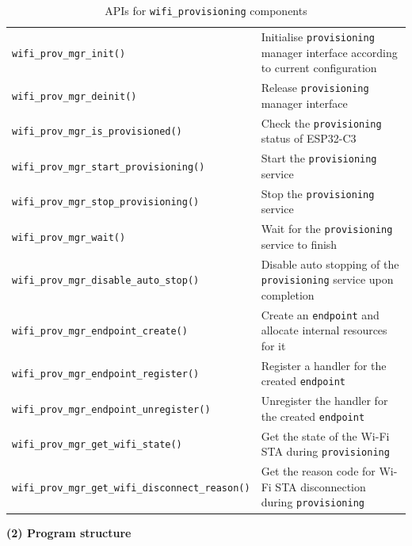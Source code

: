 \documentclass[a4paper,12pt,openany]{book}
\renewcommand{\arraystretch}{1}
\begin{document}
\begin{table}[h!]
    \renewcommand{\arraystretch}{1}
    \caption{APIs for \texttt{wifi\_provisioning} components}
    \begin{tabular}{|>{\footnotesize}m{}|>{\footnotesize}m{}|}
        \hline
        \rowcolor{LightBlue}\multicolumn{1}{|c|}{\textbf{API}}&\multicolumn{1}{c|}{\textbf{Description}}\\
        \hline
        \verb|wifi_prov_mgr_init()|&Initialise \verb|provisioning| manager interface according to current configuration\\
        \hline
        \verb|wifi_prov_mgr_deinit()|&Release \verb|provisioning| manager interface\\
        \hline
        \verb|wifi_prov_mgr_is_provisioned()|&Check the \verb|provisioning| status of ESP32-C3\\
        \hline
        \verb|wifi_prov_mgr_start_provisioning()|&Start the \verb|provisioning| service\\
        \hline
        \verb|wifi_prov_mgr_stop_provisioning()|&Stop the \verb|provisioning| service\\
        \hline
        \verb|wifi_prov_mgr_wait()|&Wait for the \verb|provisioning| service to finish\\
        \hline
        \verb|wifi_prov_mgr_disable_auto_stop()|&Disable auto stopping of the \verb|provisioning| service upon completion\\
        \hline
        \verb|wifi_prov_mgr_endpoint_create()|&Create an \verb|endpoint| and allocate internal resources for it\\
        \hline
        \verb|wifi_prov_mgr_endpoint_register()|&Register a handler for the created \verb|endpoint|\\
        \hline
        \verb|wifi_prov_mgr_endpoint_unregister()|&Unregister the handler for the created \verb|endpoint|\\
        \hline
        \verb|wifi_prov_mgr_get_wifi_state()|&Get the state of the Wi-Fi STA during \verb|provisioning|\\
        \hline
        \verb|wifi_prov_mgr_get_wifi_disconnect_reason()|&Get the reason code for Wi-Fi STA disconnection during \verb|provisioning|\\
        \hline
    \end{tabular}
\end{table}

\textbf{(2) Program structure}
\end{document}
